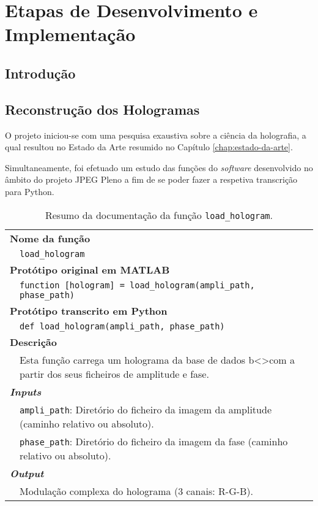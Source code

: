 \chapter{Etapas de Desenvolvimento e Implementação}
\label{chap:imp-test}

\section{Introdução}
\label{chap4:sec:intro}

\section{Reconstrução dos Hologramas}
\label{chap4:sec:...}

O projeto iniciou-se com uma pesquisa exaustiva sobre a ciência da holografia, a qual resultou no Estado da Arte resumido no Capítulo \ref{chap:estado-da-arte}.

Simultaneamente, foi efetuado um estudo das funções do \textit{software} desenvolvido no âmbito do projeto JPEG Pleno a fim de se poder fazer a respetiva transcrição para Python.

\begin{table}[!htbp]
    \centering
    \caption{Resumo da documentação da função \texttt{load\_hologram}.}
    \label{tab:load_hologram}
    \begin{tabular}{p{1cm} p{10cm}}
        \hline
        \multicolumn{2}{l}{\bfseries Nome da função}\\
         & \verb|load_hologram|\\
        \hline
        \multicolumn{2}{l}{\bfseries Protótipo original em MATLAB}\\
         & \texttt{function [hologram] = load_hologram(ampli_path, phase_path)}\\
        \hline
        \multicolumn{2}{l}{\bfseries Protótipo transcrito em Python}\\
         & \texttt{def load_hologram(ampli_path, phase_path)} \\
        \hline\multicolumn{2}{l}{\bfseries Descrição}\\
         & Esta função carrega um holograma da base de dados b<>com a partir dos seus ficheiros de amplitude e fase.\\
        \hline\multicolumn{2}{l}{\bfseries \textit{Inputs}}\\
         & \verb|ampli_path|: Diretório do ficheiro da imagem da amplitude (caminho relativo ou absoluto).\\
         & \verb|phase_path|: Diretório do ficheiro da imagem da fase (caminho relativo ou absoluto).\\
        \hline\multicolumn{2}{l}{\bfseries \textit{Output}}\\
         & Modulação complexa do holograma (3 canais: R-G-B).\\
        \hline
    \end{tabular}
\end{table}


